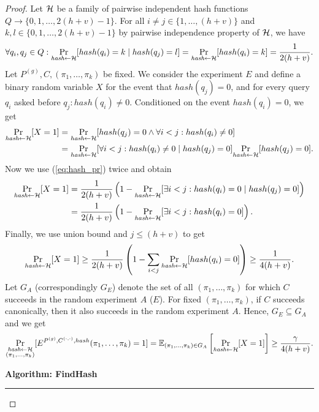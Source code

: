 \begin{proof}
Let $\mathcal{H}$ be a family of pairwise independent hash functions $Q \rightarrow \{0,1, \dots,2(h+v)-1\}$.
For all $i \neq j \in \{1, \dots, (h+v)\}$ and $k,l \in \{0,1,\dots,2(h+v)-1\}$ by pairwise independence property of $\mathcal{H}$,
we have
\begin{align}
  \label{eq:hash_pr}
 \forall q_i,q_j \in Q : \underset{\textit{hash} \leftarrow \mathcal{H}}{\Pr}[hash(q_i) = k \mid hash(q_j) = l] = \underset{\textit{hash} \leftarrow \mathcal{H}}{\Pr}[hash(q_i) = k] = \frac{1}{2(h+v)}.
\end{align}
Let $P^{(g)}, C, (\pi_1, \dots, \pi_k)$ be fixed. We consider the experiment $E$ and define a binary random variable $X$ for the event that $hash(q_j) = 0$, and for
every query $q_i$ asked before $q_j : hash(q_i) \neq 0$.
Conditioned on the event $hash(q_i) = 0$, we get
\begin{align*}
  \underset{\textit{hash} \leftarrow \mathcal{H}}{\Pr}[X=1] &= \underset{\textit{hash} \leftarrow \mathcal{H}}{\Pr}[hash(q_j) = 0 \land \forall i < j : hash(q_i) \neq 0] \\
  &=\underset{\textit{hash} \leftarrow \mathcal{H}}{\Pr}[\forall i < j : hash(q_i) \neq 0 \mid hash(q_j) = 0] \underset{\textit{hash} \leftarrow \mathcal{H}}{\Pr}[hash(q_j) = 0].
\end{align*}
Now we use (\ref{eq:hash_pr}) twice and obtain
\begin{align*}
\underset{\textit{hash} \leftarrow \mathcal{H}}{\Pr}[X=1] &=
\frac{1}{2(h+v)}\left(1 -\underset{\textit{hash} \leftarrow \mathcal{H}}{\Pr}[\exists i < j : hash(q_i) = 0 \mid hash(q_j) = 0] \right) \\
 &= \frac{1}{2(h+v)} \left( 1 -\underset{\textit{hash} \leftarrow \mathcal{H}}{\Pr}[\exists i < j : hash(q_i) = 0] \right).
\end{align*}
Finally, we use union bound and $j \leq (h+v)$ to get
\begin{align*}
\underset{\textit{hash} \leftarrow \mathcal{H}}{\Pr}[X=1] \geq
\frac{1}{2(h+v)} \left( 1 - \sum_{i < j} \underset{\textit{hash} \leftarrow \mathcal{H}}{\Pr}[hash(q_i) = 0] \right) \geq \frac{1}{4(h+v)}.
\end{align*}
Let $G_A$ (correspondingly $G_E$) denote the set of all $(\pi_1, \dots, \pi_k)$ for which $C$ succeeds in the random experiment $A$ ($E$).
For fixed $(\pi_1, \dots, \pi_k)$, if $C$ succeeds canonically, then it also succeeds in the random experiment $A$.
Hence, $G_E \subseteq G_A$ and we get
\begin{align}
  \label{ineq:hash_high_prob}
\underset{\substack{\textit{hash} \leftarrow \mathcal{H} \\ (\pi_1, \dots, \pi_k)}}{\Pr}[E^{P^{(g)}, C^{(\cdot, \cdot)}, hash}(\pi_1, \dots, \pi_k) = 1] =
\mathbb{E}_{(\pi_1, \dots, \pi_k) \in G_A}\left[\underset{\substack{\textit{hash} \leftarrow \mathcal{H}}}{\Pr}[X = 1]\right]
\geq \frac{\gamma}{4(h+v)}.
\end{align}
%
\begin{codeblock}
  \textbf{Algorithm: FindHash}
  \medskip
  \hrule
  \medskip


\end{codeblock}
\end{proof}
